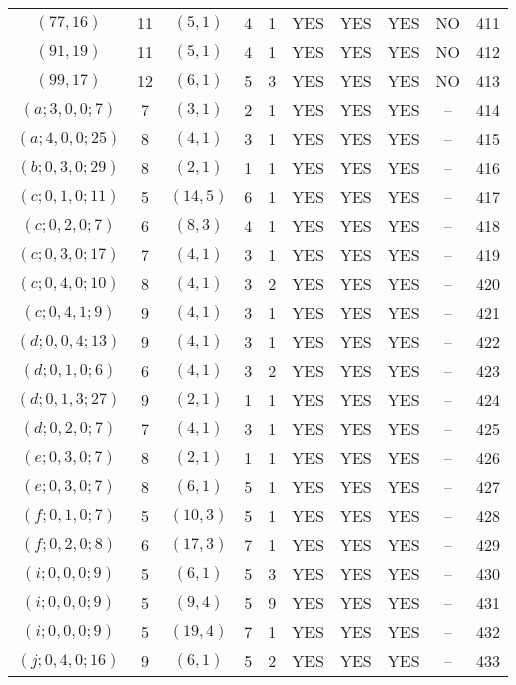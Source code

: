 \begin{longtable}{|c|c|c|c|c|c|c|c|c|c|}
$(77, 16)$ & 11 & $(5, 1)$ & 4 & 1 & YES & YES & YES & NO & 411\\
$(91, 19)$ & 11 & $(5, 1)$ & 4 & 1 & YES & YES & YES & NO & 412\\
$(99, 17)$ & 12 & $(6, 1)$ & 5 & 3 & YES & YES & YES & NO & 413\\
$(a; 3, 0, 0; 7)$ & 7 & $(3, 1)$ & 2 & 1 & YES & YES & YES & -- & 414\\
$(a; 4, 0, 0; 25)$ & 8 & $(4, 1)$ & 3 & 1 & YES & YES & YES & -- & 415\\
$(b; 0, 3, 0; 29)$ & 8 & $(2, 1)$ & 1 & 1 & YES & YES & YES & -- & 416\\
$(c; 0, 1, 0; 11)$ & 5 & $(14, 5)$ & 6 & 1 & YES & YES & YES & -- & 417\\
$(c; 0, 2, 0; 7)$ & 6 & $(8, 3)$ & 4 & 1 & YES & YES & YES & -- & 418\\
$(c; 0, 3, 0; 17)$ & 7 & $(4, 1)$ & 3 & 1 & YES & YES & YES & -- & 419\\
$(c; 0, 4, 0; 10)$ & 8 & $(4, 1)$ & 3 & 2 & YES & YES & YES & -- & 420\\
$(c; 0, 4, 1; 9)$ & 9 & $(4, 1)$ & 3 & 1 & YES & YES & YES & -- & 421\\
$(d; 0, 0, 4; 13)$ & 9 & $(4, 1)$ & 3 & 1 & YES & YES & YES & -- & 422\\
$(d; 0, 1, 0; 6)$ & 6 & $(4, 1)$ & 3 & 2 & YES & YES & YES & -- & 423\\
$(d; 0, 1, 3; 27)$ & 9 & $(2, 1)$ & 1 & 1 & YES & YES & YES & -- & 424\\
$(d; 0, 2, 0; 7)$ & 7 & $(4, 1)$ & 3 & 1 & YES & YES & YES & -- & 425\\
$(e; 0, 3, 0; 7)$ & 8 & $(2, 1)$ & 1 & 1 & YES & YES & YES & -- & 426\\
$(e; 0, 3, 0; 7)$ & 8 & $(6, 1)$ & 5 & 1 & YES & YES & YES & -- & 427\\
$(f; 0, 1, 0; 7)$ & 5 & $(10, 3)$ & 5 & 1 & YES & YES & YES & -- & 428\\
$(f; 0, 2, 0; 8)$ & 6 & $(17, 3)$ & 7 & 1 & YES & YES & YES & -- & 429\\
$(i; 0, 0, 0; 9)$ & 5 & $(6, 1)$ & 5 & 3 & YES & YES & YES & -- & 430\\
$(i; 0, 0, 0; 9)$ & 5 & $(9, 4)$ & 5 & 9 & YES & YES & YES & -- & 431\\
$(i; 0, 0, 0; 9)$ & 5 & $(19, 4)$ & 7 & 1 & YES & YES & YES & -- & 432\\
$(j; 0, 4, 0; 16)$ & 9 & $(6, 1)$ & 5 & 2 & YES & YES & YES & -- & 433
\end{longtable}
